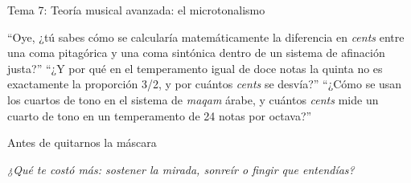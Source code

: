 \begin{frame}{Tema 7: Teoría musical avanzada: el microtonalismo}
  \footnotesize
  \begin{enumerate}
    \setlength{\itemsep}{0.12cm}
      {\enquote{Oye, ¿tú sabes cómo se calcularía matemáticamente la diferencia en \textit{cents} entre una coma pitagórica y una coma sintónica dentro de un sistema de afinación justa?}}
      {\enquote{¿Y por qué en el temperamento igual de doce notas la quinta no es exactamente la proporción 3/2, y por cuántos \textit{cents} se desvía?}}
      {\enquote{¿Cómo se usan los cuartos de tono en el sistema de \textit{maqam} árabe, y cuántos \textit{cents} mide un cuarto de tono en un temperamento de 24 notas por octava?}}
  \end{enumerate}
\end{frame}

\begin{frame}{Antes de quitarnos la máscara}
  \vfill
  \begin{center}
    {\Large\itshape\color{ColorPrincipal}
      ¿Qué te costó más: sostener la mirada, sonreír o fingir que entendías?\par}
  \end{center}
  \vfill
\end{frame}
